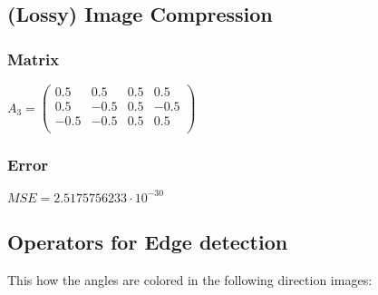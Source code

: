 \documentclass[a4paper,12pt]{article}
\begin{document}
	\subsection{(Lossy) Image Compression}
	\subsubsection{Matrix}
	$A_3 =
	\begin{pmatrix}
	0.5 & 0.5 & 0.5 & 0.5\\
	0.5 & -0.5 & 0.5 & -0.5\\
	-0.5 & -0.5 & 0.5 & 0.5\\
    \end{pmatrix}		
	$
	\subsubsection{Error}
	$MSE = 2.5175756233 \cdot 10^{-30}$
	
	\subsection{Operators for Edge detection}
	
	This how the angles are colored in the following direction images: \quad
	
\end{document}
